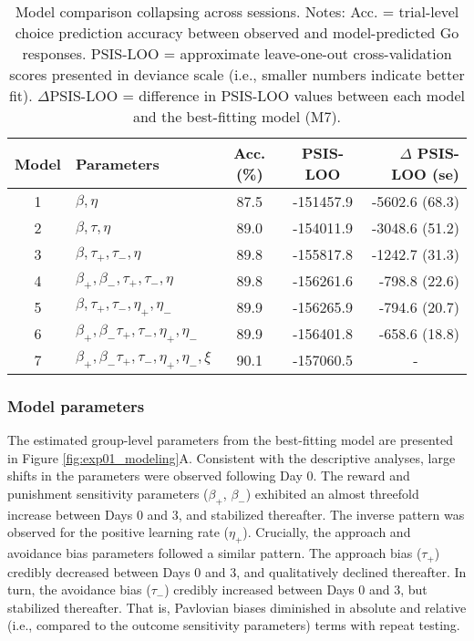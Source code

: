 \documentclass[a4paper,12pt]{article}
\begin{document}
\begin{refsection}[main]
\begin{table}[b!]
    \centering
    \begin{tabular}{clccr}
        \toprule
        Model & Parameters & Acc. (\%) & PSIS-LOO & $\Delta$ PSIS-LOO (se) \\
        \midrule
        1 & $\beta, \eta$ & 87.5 & -151457.9 & -5602.6 (68.3) \\
        2 & $\beta, \tau, \eta$ & 89.0 & -154011.9 & -3048.6 (51.2) \\
        3 & $\beta, \tau_+, \tau_-, \eta$ & 89.8 & -155817.8 & -1242.7 (31.3) \\
        4 & $\beta_+, \beta_-, \tau_+, \tau_-, \eta$ & 89.8 & -156261.6 & -798.8 (22.6) \\
        5 & $\beta, \tau_+, \tau_-, \eta_+, \eta_-$ & 89.9 & -156265.9 & -794.6 (20.7) \\
        6 & $\beta_+, \beta_- \tau_+, \tau_-, \eta_+, \eta_-$ & 89.9 & -156401.8 & -658.6 (18.8) \\
        7 & $\beta_+, \beta_- \tau_+, \tau_-, \eta_+, \eta_-, \xi$ & 90.1 & -157060.5 & \multicolumn{1}{c}{-} \\
        \bottomrule
\end{tabular}
    \caption{Model comparison collapsing across sessions. Notes: Acc. = trial-level choice prediction accuracy between observed and model-predicted Go responses. PSIS-LOO = approximate leave-one-out cross-validation scores presented in deviance scale (i.e., smaller numbers indicate better fit). \break $\Delta$PSIS-LOO = difference in PSIS-LOO values between each model and the best-fitting model (M7).}
    \label{tab:exp1_mc_abbr}
\end{table}

\subsubsection*{Model parameters}

The estimated group-level parameters from the best-fitting model are presented in Figure \ref{fig:exp01_modeling}A. Consistent with the descriptive analyses, large shifts in the parameters were observed following Day 0. The reward and punishment sensitivity parameters ($\beta_+$, $\beta_-$) exhibited an almost threefold increase between Days 0 and 3, and stabilized thereafter. The inverse pattern was observed for the positive learning rate ($\eta_+$). Crucially, the approach and avoidance bias parameters followed a similar pattern. The approach bias ($\tau_+$) credibly decreased between Days 0 and 3, and qualitatively declined thereafter. In turn, the avoidance bias ($\tau_-$) credibly increased between Days 0 and 3, but stabilized thereafter. That is, Pavlovian biases diminished in absolute and relative (i.e., compared to the outcome sensitivity parameters) terms with repeat testing. 


\end{refsection}
\end{document}
